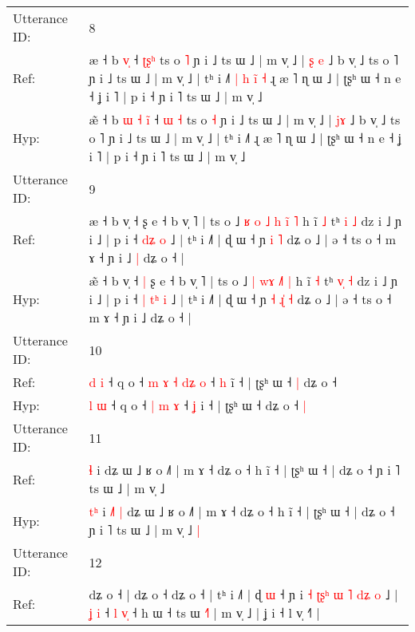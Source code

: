 \documentclass[10pt]{article}
\DeclareRobustCommand{\hl}[1]{{\textcolor{red}{#1}}}
\begin{document}
\begin{longtable}{ll}
 \\
\midrule
Utterance ID: & 8 \\
Ref: & æ\hl{} ˧ b\hl{}\hl{}\hl{}\hl{} \hl{v}\hl{̩} ˧ \hl{ʈ}\hl{ʂ}\hl{ʰ} ts o \hl{˥} ɲ i ˩ ts ɯ ˩ | m v̩ ˩ | \hl{ʂ}\hl{ }\hl{e} ˩ b v̩ ˩ ts o ˥ ɲ i ˩ ts ɯ ˩ | m v̩ ˩ | tʰ i ˩˥\hl{ }\hl{|}\hl{ }\hl{h}\hl{ }\hl{i}\hl{̃}\hl{ }\hl{˧} ɻ æ ˥ ɳ ɯ ˩ | ʈʂʰ ɯ ˧ n e ˧ ʝ i ˥ | p i ˧ ɲ i ˥ ts ɯ ˩ | m v̩ ˩
 \\
Hyp: & æ\hl{̃} ˧ b\hl{ }\hl{ɯ}\hl{ }\hl{˧} \hl{i}\hl{̃} ˧ \hl{ɯ}\hl{ }\hl{˧} ts o \hl{˧} ɲ i ˩ ts ɯ ˩ | m v̩ ˩ | \hl{}\hl{j}\hl{ɤ} ˩ b v̩ ˩ ts o ˥ ɲ i ˩ ts ɯ ˩ | m v̩ ˩ | tʰ i ˩˥\hl{}\hl{}\hl{}\hl{}\hl{}\hl{}\hl{}\hl{}\hl{} ɻ æ ˥ ɳ ɯ ˩ | ʈʂʰ ɯ ˧ n e ˧ ʝ i ˥ | p i ˧ ɲ i ˥ ts ɯ ˩ | m v̩ ˩
 \\
\midrule
Utterance ID: & 9 \\
Ref: & æ\hl{} ˧ b v̩ ˧\hl{}\hl{} ʂ e ˧ b v̩ ˥ | ts o ˩\hl{ }\hl{ʁ} \hl{o} \hl{˩}\hl{ }\hl{h} \hl{i}\hl{̃} \hl{˥} h ĩ \hl{˩} tʰ \hl{}\hl{i} \hl{˩} dz i ˩ ɲ i ˩ | p i ˧\hl{}\hl{} \hl{d}\hl{ʑ} \hl{o} ˩ | tʰ i ˩˥ | ɖ ɯ ˧ ɲ\hl{}\hl{} \hl{}\hl{i} \hl{˥} dʑ o ˩ | ə ˧ ts o ˧ m ɤ ˧ ɲ i ˩\hl{ }\hl{|} dʑ o ˧ |
 \\
Hyp: & æ\hl{̃} ˧ b v̩ ˧\hl{ }\hl{|} ʂ e ˧ b v̩ ˥ | ts o ˩\hl{}\hl{} \hl{|} \hl{}\hl{w}\hl{ɤ} \hl{˩}\hl{˥} \hl{|} h ĩ \hl{˧} tʰ \hl{v}\hl{̩} \hl{˧} dz i ˩ ɲ i ˩ | p i ˧\hl{ }\hl{|} \hl{t}\hl{ʰ} \hl{i} ˩ | tʰ i ˩˥ | ɖ ɯ ˧ ɲ\hl{ }\hl{˧} \hl{ɻ}\hl{̍} \hl{˧} dʑ o ˩ | ə ˧ ts o ˧ m ɤ ˧ ɲ i ˩\hl{}\hl{} dʑ o ˧ |
 \\
\midrule
Utterance ID: & 10 \\
Ref: & \hl{d} \hl{i} ˧ q o ˧\hl{ }\hl{m}\hl{ }\hl{ɤ} \hl{˧} \hl{d}\hl{ʑ} \hl{o} ˧ \hl{h} i\hl{̃} ˧ | ʈʂʰ ɯ ˧\hl{ }\hl{|} dʑ o ˧\hl{}\hl{}
 \\
Hyp: & \hl{l} \hl{ɯ} ˧ q o ˧\hl{}\hl{}\hl{}\hl{} \hl{|} \hl{}\hl{m} \hl{ɤ} ˧ \hl{ʝ} i\hl{} ˧ | ʈʂʰ ɯ ˧\hl{}\hl{} dʑ o ˧\hl{ }\hl{|}
 \\
\midrule
Utterance ID: & 11 \\
Ref: & \hl{}\hl{ɬ} i\hl{}\hl{}\hl{}\hl{}\hl{} dʑ ɯ ˩ ʁ o ˩˥ | m ɤ ˧ dʑ o ˧ h ĩ ˧ | ʈʂʰ ɯ ˧ | dʑ o ˧ ɲ i ˥ ts ɯ ˩ | m v̩ ˩\hl{}\hl{}
 \\
Hyp: & \hl{t}\hl{ʰ} i\hl{ }\hl{˩}\hl{˥}\hl{ }\hl{|} dʑ ɯ ˩ ʁ o ˩˥ | m ɤ ˧ dʑ o ˧ h ĩ ˧ | ʈʂʰ ɯ ˧ | dʑ o ˧ ɲ i ˥ ts ɯ ˩ | m v̩ ˩\hl{ }\hl{|}
 \\
\midrule
Utterance ID: & 12 \\
Ref: & dʑ o ˧ | dʑ o ˧ dʑ o ˧ | tʰ i ˩˥ | ɖ \hl{ɯ} ˧ ɲ i\hl{ }\hl{˧}\hl{ }\hl{ʈ}\hl{ʂ}\hl{ʰ}\hl{ }\hl{ɯ}\hl{ }\hl{˥} \hl{d}\hl{ʑ}\hl{ }\hl{o} ˩ |\hl{ }\hl{ʝ} \hl{i} ˧\hl{ }\hl{l} \hl{v}\hl{̩} ˧ h ɯ ˧ ts ɯ \hl{˧}˥ | m v̩ ˩ | ʝ i ˧ l v̩ ˧˥ |

\end{longtable}
\end{document}
